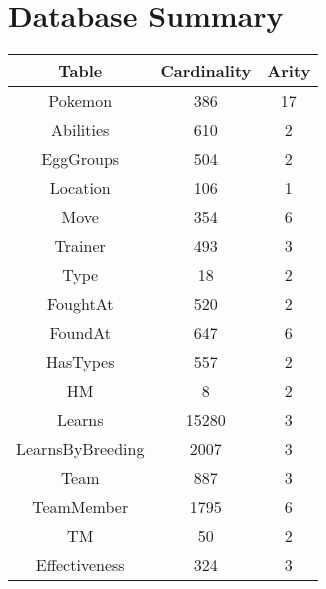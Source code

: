 \documentclass{article}
\begin{document}
\section{Database Summary}
\begin{center}
    \begin{tabular}{ccc}
        \toprule
        Table & Cardinality & Arity\\
        \midrule
        Pokemon & 386 & 17\\
        Abilities & 610 & 2\\
        EggGroups & 504 & 2\\
        Location & 106 & 1\\
        Move & 354 & 6\\
        Trainer & 493 & 3\\
        Type & 18 & 2\\
        FoughtAt & 520 & 2\\
        FoundAt & 647 & 6\\
        HasTypes & 557 & 2\\
        HM & 8 & 2\\
        Learns & 15280 & 3\\
        LearnsByBreeding & 2007 & 3\\
        Team & 887 & 3\\
        TeamMember & 1795 & 6\\
        TM & 50 & 2\\
        Effectiveness & 324 & 3\\
        \bottomrule
    \end{tabular}
\end{center}
\end{document}
